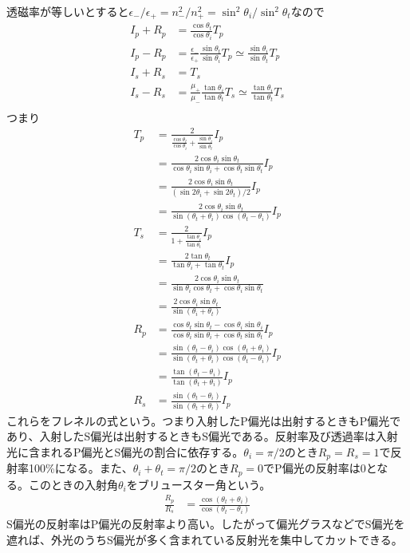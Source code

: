     透磁率が等しいとすると$\epsilon_- / \epsilon_+ = n_-^2 / n_+^2 = \sin^2\theta_i / \sin^2\theta_t$なので
    \begin{align*}
        I_p + R_p &= \frac{\cos\theta_t}{\cos\theta_i}T_p\\
        I_p - R_p &= \frac{\epsilon_-}{\epsilon_+}\frac{\sin\theta_t}{\sin\theta_i}T_p \simeq \frac{\sin\theta_i}{\sin\theta_t}T_p\\
        I_s + R_s &= T_s\\
        I_s - R_s &= \frac{\mu_+}{\mu_-}\frac{\tan\theta_i}{\tan\theta_t}T_s \simeq \frac{\tan\theta_i}{\tan\theta_t}T_s\\
    \end{align*}
    つまり
    \begin{align*}
        T_p &= \frac{2}{\frac{\cos\theta_t}{\cos\theta_i} + \frac{\sin\theta_i}{\sin\theta_t}}I_p\\
            &= \frac{2\cos\theta_i\sin\theta_t}{\cos\theta_i\sin\theta_i + \cos\theta_t\sin\theta_t}I_p\\
            &= \frac{2\cos\theta_i\sin\theta_t}{(\sin2\theta_i + \sin2\theta_t) / 2}I_p\\
            &= \frac{2\cos\theta_i\sin\theta_t}{\sin(\theta_t + \theta_i)\cos(\theta_t - \theta_i)}I_p\\
        T_s &= \frac{2}{1 + \frac{\tan\theta_i}{\tan\theta_t}}I_p\\
            &= \frac{2\tan\theta_t}{\tan\theta_i + \tan\theta_t}I_p\\
            &= \frac{2\cos\theta_i\sin\theta_t}{\sin\theta_i\cos\theta_t + \cos\theta_i\sin\theta_t}\\
            &= \frac{2\cos\theta_i\sin\theta_t}{\sin(\theta_i + \theta_t)}\\
        R_p &= \frac{\cos\theta_t\sin\theta_t - \cos\theta_i\sin\theta_i}{\cos\theta_i\sin\theta_i + \cos\theta_t\sin\theta_t}I_p\\
            &= \frac{\sin(\theta_t - \theta_i)\cos(\theta_t + \theta_i)}{\sin(\theta_t + \theta_i)\cos(\theta_t - \theta_i)}I_p\\
            &= \frac{\tan(\theta_t - \theta_i)}{\tan(\theta_t + \theta_i)}I_p\\
            R_s
            &= \frac{\sin(\theta_t - \theta_i)}{\sin(\theta_t + \theta_i)}I_p
    \end{align*}
    これらをフレネルの式という。つまり入射したP偏光は出射するときもP偏光であり、入射したS偏光は出射するときもS偏光である。反射率及び透過率は入射光に含まれるP偏光とS偏光の割合に依存する。$\theta_i = \pi / 2$のとき$R_p = R_s = 1$で反射率100\%になる。また、$\theta_i + \theta_t = \pi / 2$のとき$R_p = 0$でP偏光の反射率は0となる。このときの入射角$\theta_i$をブリュースター角という。
    \begin{align*}
        \frac{R_p}{R_s}
        &= \frac{\cos(\theta_t + \theta_i)}{\cos(\theta_t - \theta_i)}
    \end{align*}
    S偏光の反射率はP偏光の反射率より高い。したがって偏光グラスなどでS偏光を遮れば、外光のうちS偏光が多く含まれている反射光を集中してカットできる。


